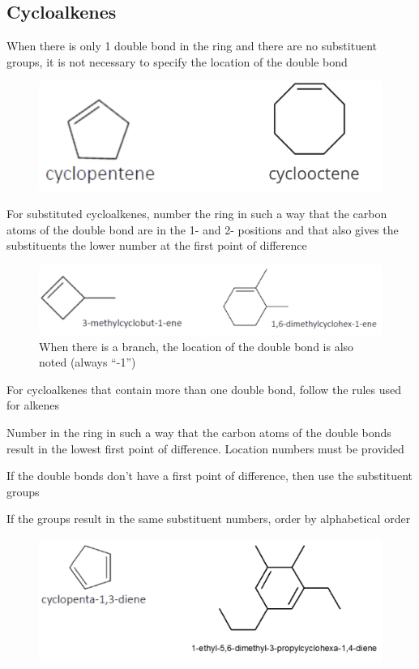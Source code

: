 \subsection{Cycloalkenes}
\begin{bulleted-list}
    \item When there is only 1 double bond in the ring and there are no substituent groups, it is not
    necessary to specify the location of the double bond
    \begin{figure}[ht!]
        \centering
        \includegraphics[width=0.6 \textwidth]{../figures/cyclopentene-cyclooctene.png}
    \end{figure}
    \item For substituted cycloalkenes, number the ring in such a way that the carbon atoms of
        the double bond are in the 1- and 2- positions and that also gives the substituents the
        lower number at the first point of difference
        \begin{figure}[ht!]
            \centering
            \includegraphics[width=0.6 \textwidth]{../figures/cycloalkenes-substituents.png}
            \caption{When there is a branch, the location of the double bond is also noted
            (always ``-1'')}
        \end{figure}
    \item For cycloalkenes that contain more than one double bond, follow the rules used for alkenes
        \begin{bulleted-list}
            \item Number in the ring in such a way that the carbon atoms of the double bonds result
                in the lowest first point of difference. Location numbers must be provided
            \item If the double bonds don't have a first point of difference, then use the substituent
                groups
            \item If the groups result in the same substituent numbers, order by alphabetical order
        \end{bulleted-list}
        \begin{figure}[ht!]
            \centering
            \includegraphics[width=0.6 \textwidth]{../figures/cycloalkenes-examples.png}
        \end{figure}
\end{bulleted-list}
